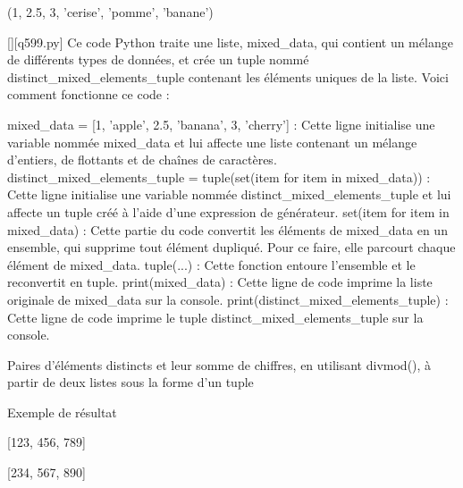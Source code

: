 (1, 2.5, 3, 'cerise', 'pomme', 'banane')
        \par
        \begin{solution}
            \renewcommand{\nomfichier}{q599.py}
            \pythonfile{\chemincode \nomfichier}[][\nomfichier]
            Ce code Python traite une liste, mixed\_data, qui contient un mélange de différents types de données, et crée un tuple nommé distinct\_mixed\_elements\_tuple contenant les éléments uniques de la liste. Voici comment fonctionne ce code :

    mixed\_data = [1, 'apple', 2.5, 'banana', 3, 'cherry'] : Cette ligne initialise une variable nommée mixed\_data et lui affecte une liste contenant un mélange d'entiers, de flottants et de chaînes de caractères.
    distinct\_mixed\_elements\_tuple = tuple(set(item for item in mixed\_data)) : Cette ligne initialise une variable nommée distinct\_mixed\_elements\_tuple et lui affecte un tuple créé à l'aide d'une expression de générateur.
        set(item for item in mixed\_data) : Cette partie du code convertit les éléments de mixed\_data en un ensemble, qui supprime tout élément dupliqué. Pour ce faire, elle parcourt chaque élément de mixed\_data.
        tuple(...) : Cette fonction entoure l'ensemble et le reconvertit en tuple.
    print(mixed\_data) : Cette ligne de code imprime la liste originale de mixed\_data sur la console.
    print(distinct\_mixed\_elements\_tuple) : Cette ligne de code imprime le tuple distinct\_mixed\_elements\_tuple sur la console.
        \end{solution}
        

        \question
        Paires d'éléments distincts et leur somme de chiffres, en utilisant divmod(), à partir de deux listes sous la forme d'un tuple

Exemple de résultat

[123, 456, 789]

[234, 567, 890]

